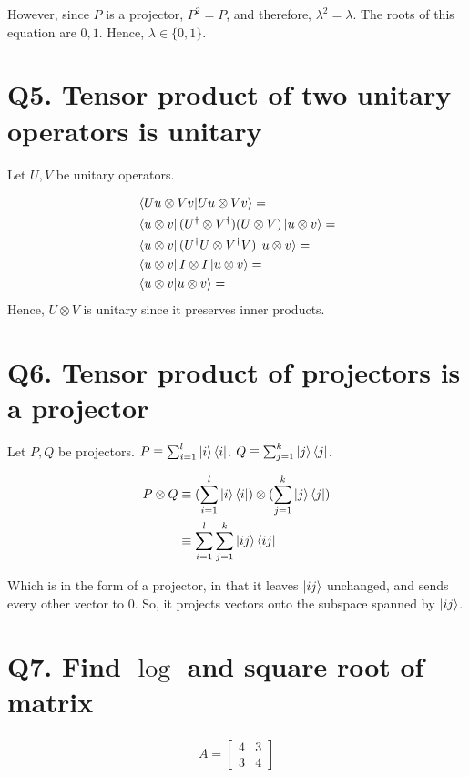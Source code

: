 \documentclass[11pt]{book}
\begin{document}
However, since $P$ is a projector, $P^2 = P$, and therefore, $\lambda^2 = \lambda$.
The roots of this equation are $0, 1$. Hence, $\lambda \in \{0, 1\}$.

\section{Q5. Tensor product of two unitary operators is unitary}
Let $U, V$ be unitary operators.

\begin{align*}
    &\bra{U u \otimes V v} \ket{U u \otimes V v} = \\
    &\bra{u \otimes v} (U^\dagger \otimes V^\dagger) (U \otimes V) \ket{u \otimes v} =  \\
    &\bra{u \otimes v} (U^\dagger U \otimes V^\dagger V) \ket{u \otimes v} = \\
    &\bra{u \otimes v} I \otimes I \ket{u \otimes v} = \\
    &\bra{u \otimes v} \ket{u \otimes v} = \\
\end{align*}
Hence, $U \otimes V$ is unitary since it preserves inner products.

\section{Q6. Tensor product of projectors is a projector}
Let $P, Q$ be projectors. $P \equiv \sum_{i=1}^l \ket{i}\bra{i}$.
$Q \equiv \sum_{j=1}^k \ket{j}\bra{j}$.


\begin{align*}
    P \otimes Q &\equiv (\sum_{i=1}^l \ket{i}\bra{i}) \otimes (\sum_{j=1}^k \ket{j}\bra{j}) \\
                &\equiv \sum_{i=1}^l \sum_{j=1}^k \ket{ij}\bra{ij} \\
\end{align*}

Which is in the form of a projector, in that it leaves $\ket{ij}$ unchanged,
and sends every other vector to $0$. So, it projects vectors onto the
subspace spanned by $\ket{ij}$.


\section{Q7. Find $\log$ and square root of matrix}
\begin{align*}
A = \begin{bmatrix}
    4 & 3 \\
    3 & 4
\end{bmatrix}
\end{align*}
\end{document}

